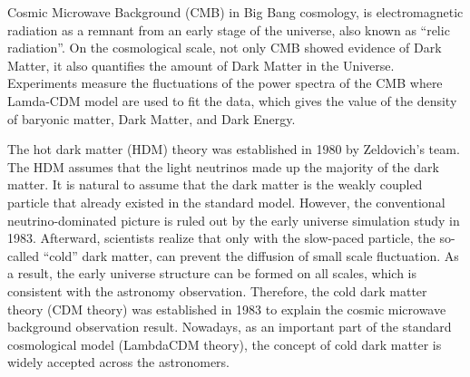 
\par Cosmic Microwave Background (CMB) in Big Bang cosmology, is electromagnetic radiation as a remnant from an early stage of the universe, also known as ``relic radiation''. On the cosmological scale, not only CMB showed evidence of Dark Matter, it also quantifies the amount of Dark Matter in the Universe. Experiments measure the fluctuations of the power spectra of the CMB where Lamda-CDM model are used to  fit the data, which gives the value of the density of baryonic matter, Dark Matter, and Dark Energy.

\par The hot dark matter (HDM) theory\cite{Zeldovich:1982zz} was established in 1980 by Zeldovich's team. The HDM assumes that the light neutrinos made up the majority of the dark matter. It is natural to assume that the dark matter is the weakly coupled particle that already existed in the standard model. However, the conventional neutrino-dominated picture is ruled out by the early universe simulation study in 1983\cite{White:1984yj}. Afterward, scientists realize that only with the slow-paced particle, the so-called ``cold'' dark matter, can prevent the diffusion of small scale fluctuation. As a result, the early universe structure can be formed on all scales, which is consistent with the astronomy observation. Therefore, the cold dark matter theory (CDM theory)\cite{PhysRevLett.48.223} was established in 1983 to explain the cosmic microwave background observation result. Nowadays, as an important part of the standard cosmological model (LambdaCDM theory), the concept of cold dark matter is widely accepted across the astronomers. 

